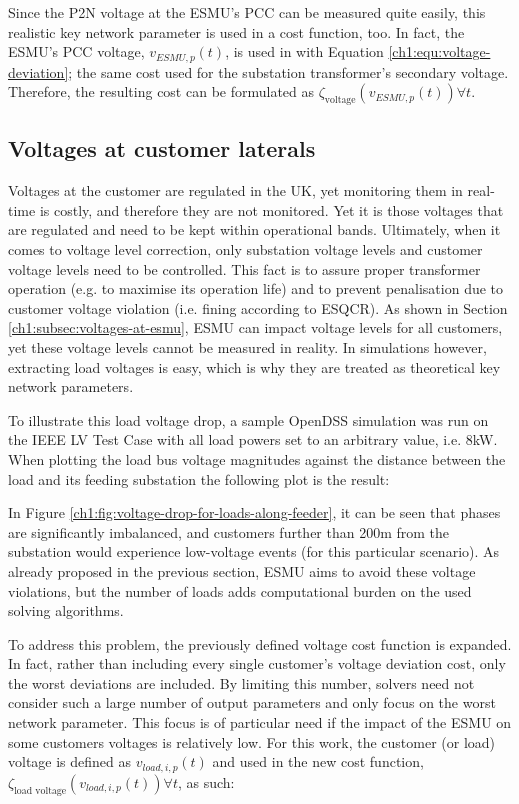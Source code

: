 Since the P2N voltage at the ESMU's PCC can be measured quite easily, this realistic key network parameter is used in a cost function, too.
In fact, the ESMU's PCC voltage, $v_{ESMU,p}(t)$, is used in with Equation \ref{ch1:equ:voltage-deviation}; the same cost used for the substation transformer's secondary voltage.
Therefore, the resulting cost can be formulated as $\zeta_\text{voltage}(v_{ESMU,p}(t)) \forall t$.

\subsection{Voltages at customer laterals}
\label{ch1:subsec:voltages-at-customers}

Voltages at the customer are regulated in the UK, yet monitoring them in real-time is costly, and therefore they are not monitored.
Yet it is those voltages that are regulated and need to be kept within operational bands.
Ultimately, when it comes to voltage level correction, only substation voltage levels and customer voltage levels need to be controlled.
This fact is to assure proper transformer operation (e.g. to maximise its operation life) and to prevent penalisation due to customer voltage violation (i.e. fining according to ESQCR).
As shown in Section \ref{ch1:subsec:voltages-at-esmu}, ESMU can impact voltage levels for all customers, yet these voltage levels cannot be measured in reality.
In simulations however, extracting load voltages is easy, which is why they are treated as theoretical key network parameters.

To illustrate this load voltage drop, a sample OpenDSS simulation was run on the IEEE LV Test Case with all load powers set to an arbitrary value, i.e. 8kW.
When plotting the load bus voltage magnitudes against the distance between the load and its feeding substation the following plot is the result:



In Figure \ref{ch1:fig:voltage-drop-for-loads-along-feeder}, it can be seen that phases are significantly imbalanced, and customers further than 200m from the substation would experience low-voltage events (for this particular scenario).
As already proposed in the previous section, ESMU aims to avoid these voltage violations, but the number of loads adds computational burden on the used solving algorithms.

To address this problem, the previously defined voltage cost function is expanded.
In fact, rather than including every single customer's voltage deviation cost, only the worst deviations are included.
By limiting this number, solvers need not consider such a large number of output parameters and only focus on the worst network parameter.
This focus is of particular need if the impact of the ESMU on some customers voltages is relatively low.
For this work, the customer (or load) voltage is defined as $v_{load,i,p}(t)$ and used in the new cost function, $\zeta_\text{load voltage}(v_{load,i,p}(t)) \forall t$, as such:

